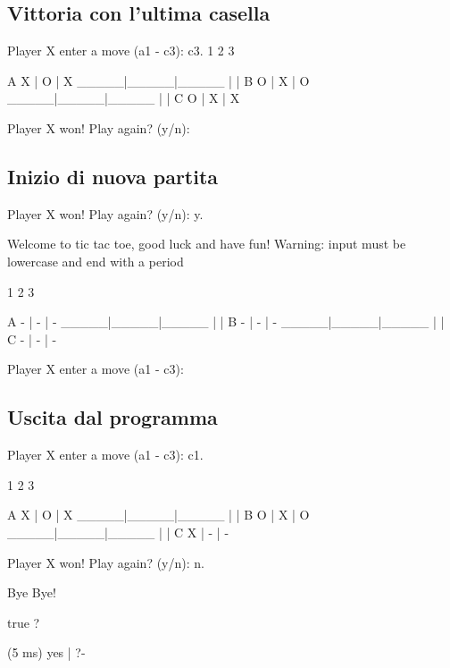\documentclass{article}
\begin{document}
\subsection{Vittoria con l'ultima casella}
    \begin{spverbatim}
    Player X enter a move (a1 - c3): c3.
         1     2     3

    A    X  |  O  |  X  
       _____|_____|_____
            |     |     
    B    O  |  X  |  O  
       _____|_____|_____
            |     |     
    C    O  |  X  |  X  

    Player X won!
    Play again? (y/n): 
    \end{spverbatim}

\subsection{Inizio di nuova partita}
    \begin{spverbatim}
    Player X won!
    Play again? (y/n): y.

    Welcome to tic tac toe, good luck and have fun!
    Warning: input must be lowercase and end with a period

         1     2     3

    A    -  |  -  |  -  
       _____|_____|_____
            |     |     
    B    -  |  -  |  -  
       _____|_____|_____
            |     |     
    C    -  |  -  |  -  

    Player X enter a move (a1 - c3):
    \end{spverbatim}

\subsection{Uscita dal programma}
    \begin{spverbatim}
    Player X enter a move (a1 - c3): c1.

         1     2     3

    A    X  |  O  |  X  
       _____|_____|_____
            |     |     
    B    O  |  X  |  O  
       _____|_____|_____
            |     |     
    C    X  |  -  |  -  

    Player X won!
    Play again? (y/n): n.

    Bye Bye!

    true ? 

    (5 ms) yes
    | ?- 
    \end{spverbatim}
\end{document}
